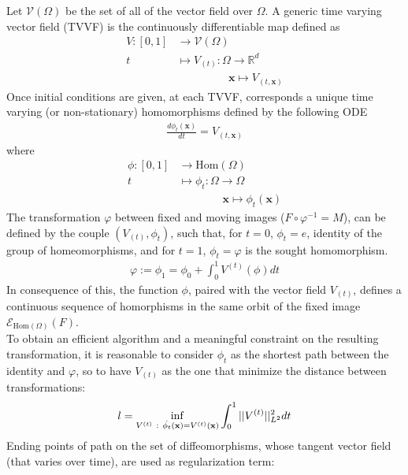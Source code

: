 Let $\mathcal{V}(\Omega)$ be the set of all of the vector field over $\Omega$. A generic time varying vector field (TVVF) is the continuously differentiable map defined as
\begin{align*}
V:[0,1] & \longrightarrow  \mathcal{V}(\Omega)\\
t  &\longmapsto  V_{(t)}  : \Omega \longrightarrow   \mathbb{R}^{d} \\
& \qquad \quad \quad ~~~\mathbf{x} \longmapsto V_{(t,\mathbf{x} )}
\end{align*}
 Once initial conditions are given, at each TVVF, corresponds a unique time varying (or non-stationary) homomorphisms defined  by the following ODE 
\begin{align}\label{eq:ode_phi_v}
\frac{d\phi_{t} (\mathbf{x})}{dt} = V_{(t,\mathbf{x} )}
\end{align}
where 
\begin{align*}
\phi : [0,1] & \longrightarrow  \text{Hom}(\Omega)\\
t  &\longmapsto \phi_{t}  : \Omega \longrightarrow    \Omega \\
& \qquad \quad \quad  \mathbf{x} \longmapsto \phi_{t}  (\mathbf{x} )
\end{align*}
The transformation $\varphi$ between fixed and moving images ($ F\circ \varphi^{-1} = M $), can be defined by the couple $(V_{(t)},\phi_{t})$, such that, for $t = 0$, $\phi_{t} = e$, identity of the group of homeomorphisms, and for $t = 1$, $\phi_{t} = \varphi$ is the sought homomorphism.
\begin{align*}
\varphi := \phi_{1} = \phi_{0} + \int_0^1 V^{(t)} (\phi) dt
\end{align*}
In consequence of this, the function $\phi$, paired with the vector field $V_{(t)}$, defines a continuous sequence of homorphisms in the same orbit of the fixed image $\mathcal{E}_{\text{Hom}(\Omega)}(F)$. \\
To obtain an efficient algorithm and a meaningful constraint on the resulting transformation, it is reasonable to consider $\phi_{t}$ as the shortest path between the identity and $\varphi$, so to have $V_{(t)} $ as the one that minimize the distance between transformations:
\begin{align*}
l = \inf_{V^{(t)} ~ : ~ \dot{\phi_{t}} (\mathbf{x}) = V^{(t)}(\mathbf{x} )}  \int_{0}^{1} \vert\lvert V^{(t)} \rvert\vert_{L^2}^{2}dt
\end{align*}
Ending points of path on the set of diffeomorphisms, whose tangent vector field (that varies over time), are used as regularization term:
